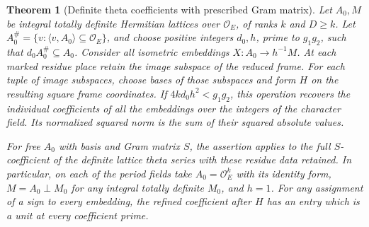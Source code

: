 \documentclass[a4paper,11pt]{article}
\newtheorem{theorem}[proposition]{Theorem}
\theoremstyle{definition}
\theoremstyle{remark}
\numberwithin{equation}{section}
\begin{document}
\begin{theorem}[Definite theta coefficients with prescribed Gram matrix]
\leavevmode\label{thm:rectangulartheta530}
Let \(A_0,M\) be integral totally definite Hermitian lattices over
\(\mathcal O_E\), of ranks \(k\) and \(D\ge k\). Let
\(A_0^\#=\{v:\langle v,A_0\rangle\subseteq\mathcal O_E\}\), and
choose positive integers \(d_0,h\), prime to \(g_1g_2\), such that
\(d_0 A_0^\#\subseteq A_0\). Consider all isometric embeddings
\(X:A_0\to h^{-1}M\). At each marked residue place retain the image
subspace of the reduced frame. For each tuple of image subspaces,
choose bases of those subspaces and form \(H\) on the resulting
square frame coordinates. If \(4k d_0 h^2<g_1g_2\), this operation
recovers the individual coefficients of all the embeddings over the
integers of the character field. Its normalized squared norm is
the sum of their squared absolute values.

For free \(A_0\) with basis and Gram matrix \(S\), the assertion
applies to the full \(S\)-coefficient of the definite lattice theta
series with these residue data retained. In particular, on each of
the period fields take \(A_0=\mathcal O_E^k\) with its identity
form, \(M=A_0\perp M_0\) for any integral totally definite \(M_0\),
and \(h=1\). For any assignment of a sign to every embedding, the
refined coefficient after \(H\) has an entry which is a unit at
every coefficient prime.
\end{theorem}
\end{document}
